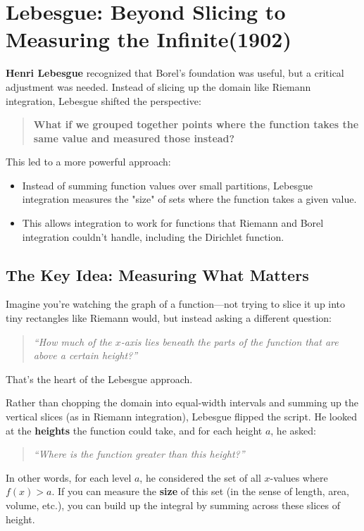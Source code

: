 \section{Lebesgue: Beyond Slicing to Measuring the Infinite(1902)}

\textbf{Henri Lebesgue} recognized that Borel’s foundation was useful, but a critical adjustment was needed. Instead of slicing up the domain like Riemann integration, Lebesgue shifted the perspective:

\begin{quote}
\textbf{What if we grouped together points where the function takes the same value and measured those instead?}
\end{quote}

This led to a more powerful approach:

\begin{itemize}
    \item Instead of summing function values over small partitions, Lebesgue integration measures the "size" of sets where the function takes a given value.
    \item This allows integration to work for functions that Riemann and Borel integration couldn’t handle, including the Dirichlet function.
\end{itemize}

\subsection{The Key Idea: Measuring What Matters}

Imagine you're watching the graph of a function—not trying to slice it up into tiny rectangles like Riemann would, but instead asking a different question:  
\begin{quote}
\emph{“How much of the $x$-axis lies beneath the parts of the function that are above a certain height?”}
\end{quote}

That’s the heart of the Lebesgue approach.

Rather than chopping the domain into equal-width intervals and summing up the vertical slices (as in Riemann integration), Lebesgue flipped the script. He looked at the \textbf{heights} the function could take, and for each height \( a \), he asked:
\begin{quote}
\emph{“Where is the function greater than this height?”}
\end{quote}

In other words, for each level \( a \), he considered the set of all \( x \)-values where \( f(x) > a \). If you can measure the \textbf{size} of this set (in the sense of length, area, volume, etc.), you can build up the integral by summing across these slices of height.


